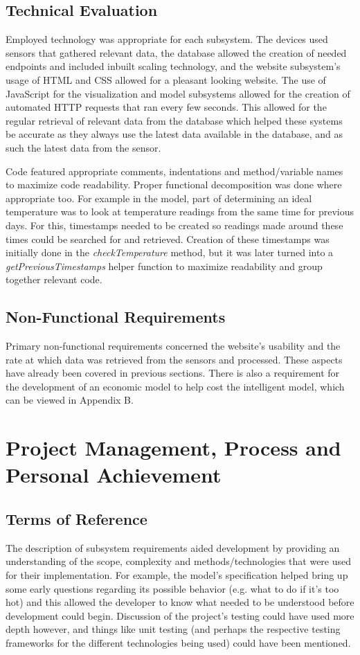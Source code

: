 \documentclass[]{report}
\begin{document}
	\subsection{Technical Evaluation}
	Employed technology was appropriate for each subsystem. The devices used sensors that gathered relevant data, the database allowed the creation of needed endpoints and included inbuilt scaling technology, and the website subsystem's usage of HTML and CSS allowed for a pleasant looking website. The use of JavaScript for the visualization and model subsystems allowed for the creation of automated HTTP requests that ran every few seconds. This allowed for the regular retrieval of relevant data from the database which helped these systems be accurate as they always use the latest data available in the database, and as such the latest data from the sensor.
	
	Code featured appropriate comments, indentations and method/variable names to maximize code readability. Proper functional decomposition was done where appropriate too. For example in the model, part of determining an ideal temperature was to look at temperature readings from the same time for previous days. For this, timestamps needed to be created so readings made around these times could be searched for and retrieved. Creation of these timestamps was initially done in the \textit{checkTemperature} method, but it was later turned into a \textit{getPreviousTimestamps} helper function to maximize readability and group together relevant code.
	
	\subsection{Non-Functional Requirements}
	Primary non-functional requirements concerned the website's usability and the rate at which data was retrieved from the sensors and processed. These aspects have already been covered in previous sections. There is also a requirement for the development of an economic model to help cost the intelligent model, which can be viewed in Appendix B.

\section{Project Management, Process and Personal Achievement}
	\subsection{Terms of Reference}
	The description of subsystem requirements aided development by providing an understanding of the scope, complexity and methods/technologies that were used for their implementation. For example, the model's specification helped bring up some early questions regarding its possible behavior (e.g. what to do if it's too hot) and this allowed the developer to know what needed to be understood before development could begin. Discussion of the project's testing could have used more depth however, and things like unit testing (and perhaps the respective testing frameworks for the different technologies being used) could have been mentioned.
	
\end{document}

